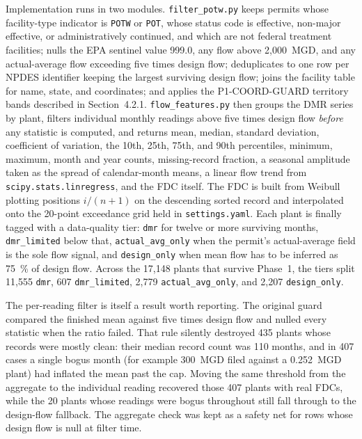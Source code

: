 \documentclass[12pt,letterpaper]{report}
\begin{document}
Implementation runs in two modules. \texttt{filter\_potw.py} keeps permits whose
facility-type indicator is \texttt{POTW} or \texttt{POT}, whose status code is
effective, non-major effective, or administratively continued, and which are not
federal treatment facilities; nulls the EPA sentinel value 999.0, any flow above
2{,}000~MGD, and any actual-average flow exceeding five times design flow;
deduplicates to one row per NPDES identifier keeping the largest surviving design
flow; joins the facility table for name, state, and coordinates; and applies the
P1-COORD-GUARD territory bands described in Section~4.2.1.
\texttt{flow\_features.py} then groups the DMR series by plant, filters
individual monthly readings above five times design flow \emph{before} any
statistic is computed, and returns mean, median, standard deviation, coefficient
of variation, the 10th, 25th, 75th, and 90th percentiles, minimum, maximum,
month and year counts, missing-record fraction, a seasonal amplitude taken as
the spread of calendar-month means, a linear flow trend from
\texttt{scipy.stats.linregress}, and the FDC itself. The FDC is built from
Weibull plotting positions $i/(n+1)$ on the descending sorted record and
interpolated onto the 20-point exceedance grid held in
\texttt{settings.yaml}. Each plant is finally tagged with a data-quality tier:
\texttt{dmr} for twelve or more surviving months, \texttt{dmr\_limited} below
that, \texttt{actual\_avg\_only} when the permit's actual-average field is the
sole flow signal, and \texttt{design\_only} when mean flow has to be inferred as
75~\% of design flow. Across the 17{,}148 plants that survive Phase~1, the tiers
split 11{,}555 \texttt{dmr}, 607 \texttt{dmr\_limited}, 2{,}779
\texttt{actual\_avg\_only}, and 2{,}207 \texttt{design\_only}.

The per-reading filter is itself a result worth reporting. The original guard
compared the finished mean against five times design flow and nulled every
statistic when the ratio failed. That rule silently destroyed 435 plants whose
records were mostly clean: their median record count was 110 months, and in 407
cases a single bogus month (for example 300~MGD filed against a 0.252~MGD
plant) had inflated the mean past the cap. Moving the same threshold from the
aggregate to the individual reading recovered those 407 plants with real FDCs,
while the 20 plants whose readings were bogus throughout still fall through to
the design-flow fallback. The aggregate check was kept as a safety net for rows
whose design flow is null at filter time.
\end{document}
